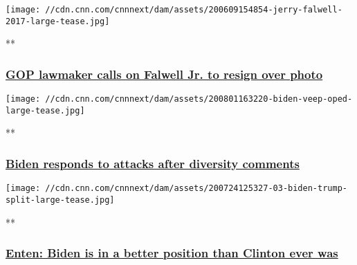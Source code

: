 \href{/videos/us/2020/08/07/jerry-falwell-jr-photo-liberty-university-vpx.cnn/video/playlists/this-week-in-politics/}{}

\texttt{[image: //cdn.cnn.com/cnnnext/dam/assets/200609154854-jerry-falwell-2017-large-tease.jpg]}

**

\hypertarget{gop-lawmaker-calls-on-falwell-jr-to-resign-over-photo}{%
\subsubsection{\texorpdfstring{\href{/videos/us/2020/08/07/jerry-falwell-jr-photo-liberty-university-vpx.cnn/video/playlists/this-week-in-politics/}{GOP
lawmaker calls on Falwell Jr. to resign over
photo}}{GOP lawmaker calls on Falwell Jr. to resign over photo}}\label{gop-lawmaker-calls-on-falwell-jr-to-resign-over-photo}}

\href{/videos/politics/2020/08/07/biden-diversity-comments-african-american-communities-saenz-nr-vpx.cnn/video/playlists/this-week-in-politics/}{}

\texttt{[image: //cdn.cnn.com/cnnnext/dam/assets/200801163220-biden-veep-oped-large-tease.jpg]}

**

\hypertarget{biden-responds-to-attacks-after-diversity-comments}{%
\subsubsection{\texorpdfstring{\href{/videos/politics/2020/08/07/biden-diversity-comments-african-american-communities-saenz-nr-vpx.cnn/video/playlists/this-week-in-politics/}{Biden
responds to attacks after diversity
comments}}{Biden responds to attacks after diversity comments}}\label{biden-responds-to-attacks-after-diversity-comments}}

\href{/videos/politics/2020/08/07/biden-ahead-trump-2020-presidential-election-enten-newday-vpx.cnn/video/playlists/this-week-in-politics/}{}

\texttt{[image: //cdn.cnn.com/cnnnext/dam/assets/200724125327-03-biden-trump-split-large-tease.jpg]}

**

\hypertarget{enten-biden-is-in-a-better-position-than-clinton-ever-was}{%
\subsubsection{\texorpdfstring{\href{/videos/politics/2020/08/07/biden-ahead-trump-2020-presidential-election-enten-newday-vpx.cnn/video/playlists/this-week-in-politics/}{Enten:
Biden is in a better position than Clinton ever
was}}{Enten: Biden is in a better position than Clinton ever was}}\label{enten-biden-is-in-a-better-position-than-clinton-ever-was}}

